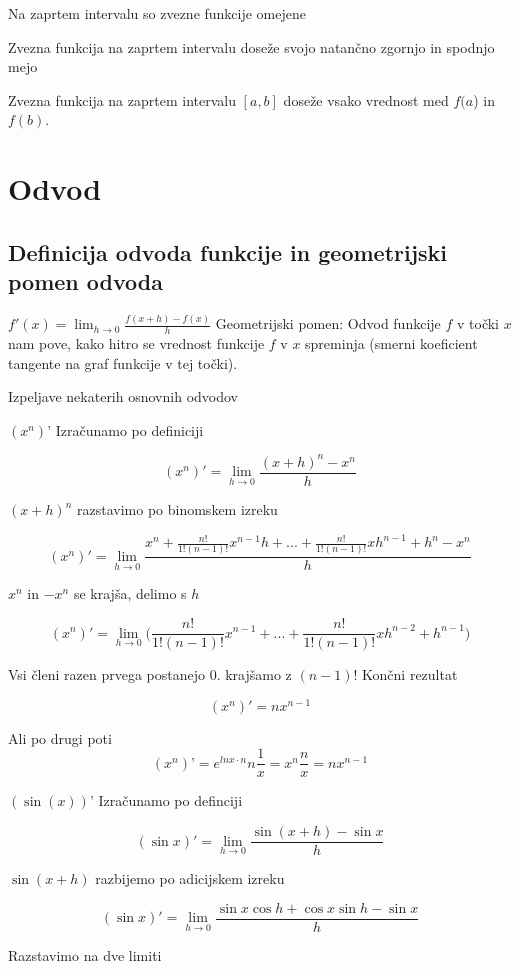 \documentclass[12pt]{report}
\begin{document}
Na zaprtem intervalu so zvezne funkcije omejene

Zvezna funkcija na zaprtem intervalu doseže svojo natančno zgornjo in spodnjo mejo

Zvezna funkcija na zaprtem intervalu $[a, b]$ doseže vsako vrednost med $f(a$) in $f(b)$.





\chapter*{Odvod}

\section*{Definicija odvoda funkcije in geometrijski pomen odvoda}
$\displaystyle f'(x)=\lim_{h \to 0}\frac{f(x+h)-f(x)}{h}$
Geometrijski pomen: Odvod funkcije $f$ v točki $x$ nam pove, kako hitro se vrednost funkcije $f$ v $x$ spreminja (smerni koeficient tangente na graf funkcije v 
tej točki).

Izpeljave nekaterih osnovnih odvodov

$(x^n)’$
Izračunamo po definiciji

\[(x^n)'= \lim_{h \to 0}\frac{(x+h)^n-x^n}{h}\]
 
$(x+h)^n$ razstavimo po binomskem izreku

\[(x^n)'= \lim_{h \to 0}\frac{x^n +\frac{n!}{1!(n-1)!}x^{n-1}h+...+\frac{n!}{1!(n-1)!}xh^{n-1}+h^n-x^n}{h}\]
 
$x^n$ in $-x^n$ se krajša, delimo s $h$
 
\[(x^n)'= \lim_{h \to 0}\bigl(\frac{n!}{1!(n-1)!}x^{n-1}+...+\frac{n!}{1!(n-1)!}xh^{n-2}+h^{n-1}\bigr)\] 
 
Vsi členi razen prvega postanejo 0. krajšamo z $(n-1)!$
Končni rezultat

\[(x^n)'=nx^{n-1}\]
 
Ali po drugi poti 
\[\left(x^n\right)’=e^{lnx \cdot n}n\frac{1}{x}=x^n \frac{n}{x}= nx^{n-1}\]

$(\sin(x))’$
Izračunamo po definciji
 
 \[(\sin x)'=\lim_{h \to 0}\frac{\sin(x+h)-\sin x}{h}\]
 
$\sin(x+h)$ razbijemo po adicijskem izreku

 \[(\sin x)'=\lim_{h \to 0}\frac{\sin x \cos h + \cos x \sin h -\sin x}{h}\]
 
Razstavimo na dve limiti
 
\end{document}
